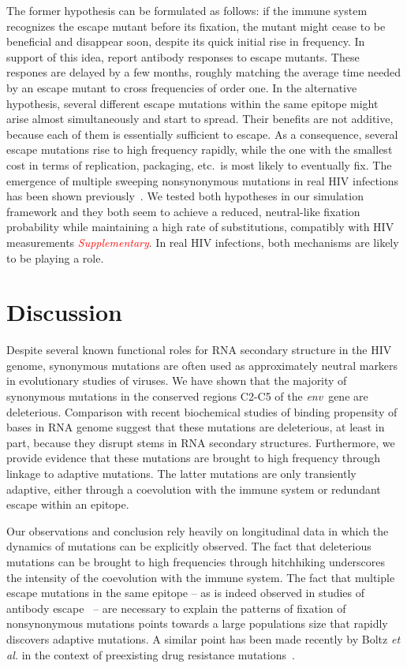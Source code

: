 \documentclass[rmp, twocolumn]{revtex4}
\newcommand{\comment}[1]{\textit{\textcolor{red}{#1}}}
\newcommand{\env}{\textit{env}}
\begin{document}
The former hypothesis can be formulated as follows: if the immune system
recognizes the escape mutant before its fixation, the mutant might cease to be
beneficial and disappear soon, despite its quick initial rise in frequency. In support of this idea,
\citet{richman_rapid_2003, bunnik_autologous_2008} report antibody responses to
escape mutants. These respones are delayed by a few months, roughly matching the
average time needed by an escape mutant to cross frequencies of order one.
In the alternative hypothesis, several different escape
mutations within the same epitope might arise almost simultaneously and start to
spread. Their benefits are not additive, because each of them is
essentially sufficient to escape. As a consequence, several escape mutations rise to
high frequency rapidly, while the one with the smallest cost in terms of replication,
packaging, etc.~is most likely to eventually fix. The emergence of
multiple sweeping nonsynonymous mutations in real HIV infections has been shown
previously~\citep{moore_limited_2009, bar_early_2012}.
We tested both hypotheses in our simulation framework and they both seem to
achieve a reduced, neutral-like fixation probability while maintaining a high
rate of substitutions, compatibly with HIV measurements \comment{Supplementary}.
In real HIV infections, both mechanisms are likely to be playing a role.

\section{Discussion}
Despite several known functional roles for RNA secondary structure in the HIV
genome, synonymous mutations are often used as approximately neutral markers in
evolutionary studies of viruses. We have shown that the majority of synonymous
mutations in the conserved regions C2-C5 of the \env~gene are deleterious.
Comparison with recent biochemical studies of binding propensity of bases in RNA
genome suggest that these mutations are deleterious, at least in part, because they disrupt
stems in RNA secondary structures. Furthermore, we provide evidence that these
mutations are brought to high frequency through linkage to adaptive mutations.
The latter mutations are only transiently adaptive, either through a
coevolution with the immune system or redundant escape within an epitope. 

Our observations and conclusion rely heavily on longitudinal data in which the
dynamics of mutations can be explicitly observed. The fact that deleterious
mutations can be brought to high frequencies through hitchhiking underscores
the intensity of the coevolution with the immune system. The fact that
multiple escape mutations in the same epitope -- as is indeed observed in
studies of antibody escape~\citep{moore_limited_2009, bar_early_2012} -- are
necessary to explain the patterns of fixation of nonsynonymous mutations points
towards a large populations size that rapidly discovers adaptive mutations. A
similar point has been made recently by Boltz {\it et al.} in the context of
preexisting drug resistance mutations~\citep{boltz_ultrasensitive_2012}. 
\end{document}
